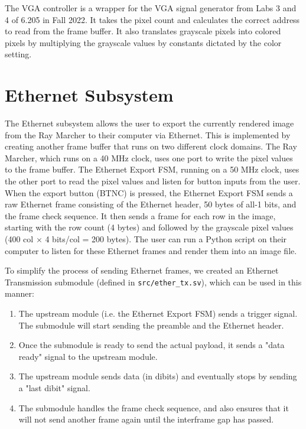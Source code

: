 \documentclass[conference]{IEEEtran}
\begin{document}
The VGA controller is a wrapper for the VGA signal generator from Labs 3 and 4 of 6.205 in Fall 2022. It takes the pixel count and calculates the correct address to read from the frame buffer. It also translates grayscale pixels into colored pixels by multiplying the grayscale values by constants dictated by the color setting.


\section{Ethernet Subsystem}

The Ethernet subsystem allows the user to export the currently rendered image from the Ray Marcher to their computer via Ethernet. This is implemented by creating another frame buffer that runs on two different clock domains. The Ray Marcher, which runs on a 40 MHz clock, uses one port to write the pixel values to the frame buffer. The Ethernet Export FSM, running on a 50 MHz clock, uses the other port to read the pixel values and listen for button inputs from the user. When the export button (BTNC) is pressed, the Ethernet Export FSM sends a raw Ethernet frame consisting of the Ethernet header, 50 bytes of all-1 bits, and the frame check sequence. It then sends a frame for each row in the image, starting with the row count (4 bytes) and followed by the grayscale pixel values (400 col $\times$ 4 bits/col = 200 bytes). The user can run a Python script on their computer to listen for these Ethernet frames and render them into an image file.

To simplify the process of sending Ethernet frames, we created an Ethernet Transmission submodule (defined in \texttt{src/ether\_tx.sv}), which can be used in this manner:

\begin{enumerate}
\item The upstream module (i.e. the Ethernet Export FSM) sends a trigger signal. The submodule will start sending the preamble and the Ethernet header.
\item Once the submodule is ready to send the actual payload, it sends a "data ready" signal to the upstream module.
\item The upstream module sends data (in dibits) and eventually stops by sending a "last dibit" signal.
\item The submodule handles the frame check sequence, and also ensures that it will not send another frame again until the interframe gap has passed.
\end{enumerate}
\end{document}
